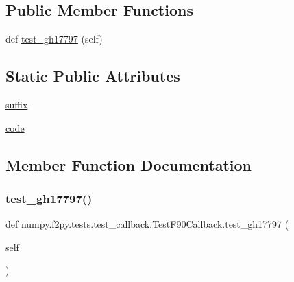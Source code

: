 \subsection*{Public Member Functions}
\begin{DoxyCompactItemize}
\item 
def \hyperlink{classnumpy_1_1f2py_1_1tests_1_1test__callback_1_1TestF90Callback_a817d1f7117926027b46bef37c1e33c1a}{test\+\_\+gh17797} (self)
\end{DoxyCompactItemize}
\subsection*{Static Public Attributes}
\begin{DoxyCompactItemize}
\item 
\hyperlink{classnumpy_1_1f2py_1_1tests_1_1test__callback_1_1TestF90Callback_a39b5b10d5433087c1325ec39fb5e7692}{suffix}
\item 
\hyperlink{classnumpy_1_1f2py_1_1tests_1_1test__callback_1_1TestF90Callback_a448a42a57f17b0e3bb2cb294e22e1bce}{code}
\end{DoxyCompactItemize}


\subsection{Member Function Documentation}
\mbox{\label{classnumpy_1_1f2py_1_1tests_1_1test__callback_1_1TestF90Callback_a817d1f7117926027b46bef37c1e33c1a}} 
\subsubsection{\texorpdfstring{test\+\_\+gh17797()}{test\_gh17797()}}
{\footnotesize\ttfamily def numpy.\+f2py.\+tests.\+test\+\_\+callback.\+Test\+F90\+Callback.\+test\+\_\+gh17797 (\begin{DoxyParamCaption}\item[{}]{self }\end{DoxyParamCaption})}



